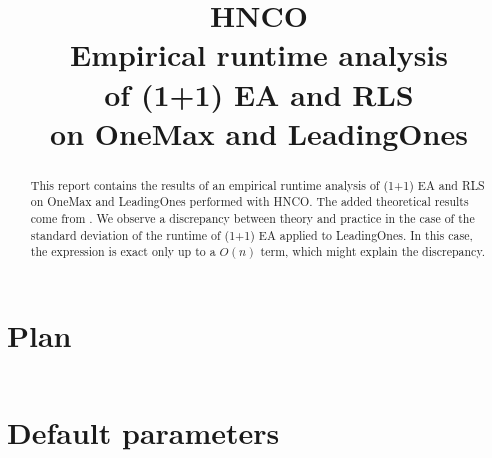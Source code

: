 \documentclass[a4paper]{article}
\begin{document}

\title{HNCO\\
  Empirical runtime analysis\\
  of (1+1) EA and RLS \\
  on OneMax and LeadingOnes}
\maketitle

\begin{abstract}
  This report contains the results of an empirical runtime analysis of
  (1+1) EA and RLS on OneMax and LeadingOnes performed with HNCO. The
  added theoretical results come from \cite{hwang2018probabilistic}.
  We observe a discrepancy between theory and practice in the case of
  the standard deviation of the runtime of (1+1) EA applied to
  LeadingOnes. In this case, the expression is exact only up to a
  $O(n)$ term, which might explain the discrepancy.
\end{abstract}

\tableofcontents



\appendix

\section{Plan}

\inputminted[breaklines=true]{json}{pretty.json}

\section{Default parameters}

\inputminted[breaklines=true]{text}{../log.defaults}

%



\end{document}
